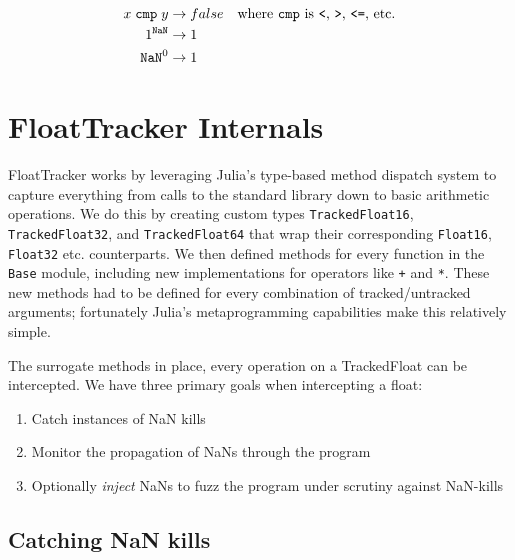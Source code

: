 \documentclass{juliacon}
\begin{document}
\begin{align*}
x \; \texttt{cmp} \; y &\rightarrow false &\text{where \texttt{cmp} is \texttt{<}, \texttt{>}, \texttt{<=}, etc.} \\
1^{\text{\texttt{NaN}}} &\rightarrow 1 \\
\text{\texttt{NaN}}^{0} &\rightarrow 1
\end{align*}



\section{FloatTracker Internals}

FloatTracker works by leveraging Julia's type-based method dispatch system to capture everything from calls to the standard library down to basic arithmetic operations.
We do this by creating custom types \texttt{TrackedFloat16}, \texttt{TrackedFloat32}, and \texttt{TrackedFloat64} that wrap their corresponding \texttt{Float16}, \texttt{Float32} etc. counterparts.
We then defined methods for every function in the \texttt{Base} module, including new implementations for operators like \texttt{+} and \texttt{*}.
These new methods had to be defined for every combination of tracked/untracked arguments;
fortunately Julia's metaprogramming capabilities make this relatively simple.

The surrogate methods in place, every operation on a TrackedFloat can be intercepted.
We have three primary goals when intercepting a float:

\begin{enumerate}
  \item Catch instances of NaN kills
  \item Monitor the propagation of NaNs through the program
  \item Optionally \emph{inject} NaNs to fuzz the program under scrutiny against NaN-kills
\end{enumerate}

%


\subsection{Catching NaN kills}
\end{document}
